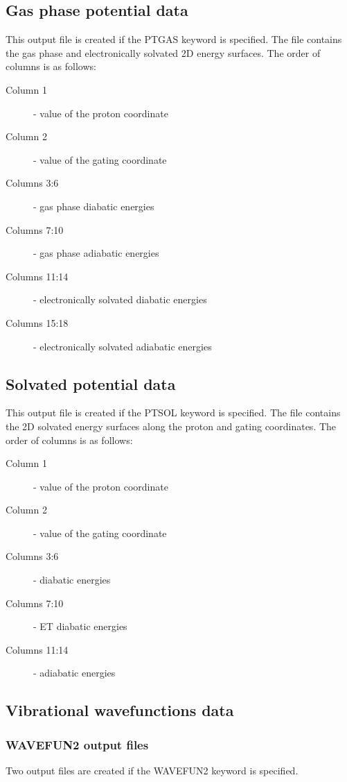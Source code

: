 \documentclass[oneside,11pt,openany]{book}
\newcommand{\tw}{\ttfamily}
\begin{document}
\subsection{Gas phase potential data}
This output file is created if the {\tw PTGAS} keyword is specified.
The file contains the gas phase and electronically solvated
2D energy surfaces. The order of columns is as follows:
\begin{description}
\item[Column 1] - value of the proton coordinate
\item[Column 2] - value of the gating coordinate
\item[Columns 3:6] - gas phase diabatic energies
\item[Columns 7:10] - gas phase adiabatic energies
\item[Columns 11:14] - electronically solvated diabatic energies
\item[Columns 15:18] - electronically solvated adiabatic energies
\end{description}

\subsection{Solvated potential data}
This output file is created if the {\tw PTSOL} keyword is specified.
The file contains the 2D solvated energy surfaces along the proton
and gating coordinates. The order of columns is as follows:
\begin{description}
\item[Column 1] - value of the proton coordinate
\item[Column 2] - value of the gating coordinate
\item[Columns 3:6] - diabatic energies
\item[Columns 7:10] -  ET diabatic energies
\item[Columns 11:14] - adiabatic energies
\end{description}

\subsection{Vibrational wavefunctions data}

\subsubsection{WAVEFUN2 output files}
Two output files are created if the {\tw WAVEFUN2} keyword is specified.
\end{document}
